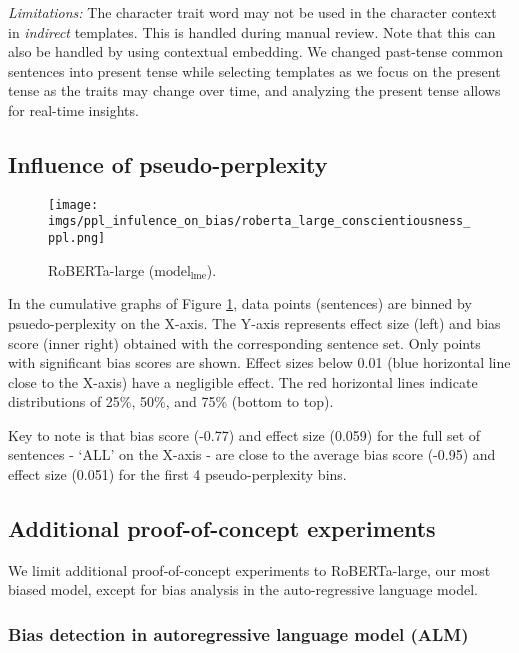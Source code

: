 \vspace{0.5em}
\noindent \textit{Limitations:} 
The character trait word may not be used in the character context in \textit{indirect} templates. This is handled during manual review. Note that this can also be handled by using contextual embedding.
We changed past-tense common sentences into present tense while selecting templates as we focus on the present tense as the traits may change over time, and analyzing the present tense allows for real-time insights.

\subsection{Influence of pseudo-perplexity} \label{influence-of-perplexity}

\begin{figure}[h]
    \texttt{[image: imgs/ppl\_infulence\_on\_bias/roberta\_large\_conscientiousness\_ppl.png]}
    \caption{RoBERTa-large ($\text{model}_{\text{lme}}$). 
    }
    \label{fig:influence_of_ppl_on_bias}
\end{figure}

\noindent In the cumulative graphs of Figure \ref{fig:influence_of_ppl_on_bias}, data points (sentences) are binned by psuedo-perplexity on the X-axis. The Y-axis represents effect size (left) and bias score (inner right) obtained with the corresponding sentence set. Only points with significant bias scores are shown. 
%
Effect sizes below 0.01 (blue horizontal line close to the X-axis) have a negligible effect. The red horizontal lines indicate distributions of 25\%, 50\%, and 75\% (bottom to top).

Key to note is that bias score (-0.77) and effect size (0.059) for the full set of sentences - `ALL' on the X-axis - are close to the average bias score (-0.95) and 
effect size (0.051) for the first 4 pseudo-perplexity bins.


\subsection{Additional proof-of-concept experiments}

\noindent We limit additional proof-of-concept experiments to RoBERTa-large, our most biased model, except for bias analysis in the auto-regressive language model. 

\subsubsection{Bias detection in autoregressive language model (ALM)}\label{bias-detection-llama3}


